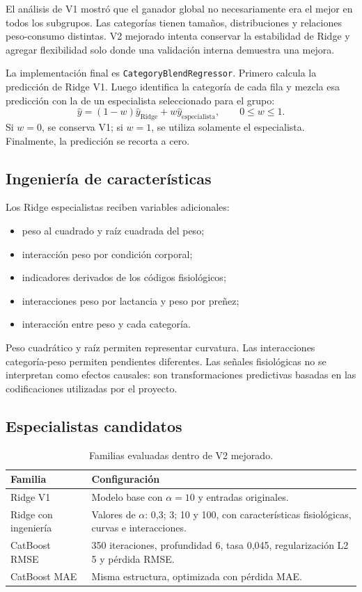 \documentclass[11pt,a4paper]{article}
\newcommand{\codigo}[1]{\nolinkurl{#1}}
\begin{document}
El análisis de V1 mostró que el ganador global no necesariamente era el mejor en todos los subgrupos. Las categorías tienen tamaños, distribuciones y relaciones peso-consumo distintas. V2 mejorado intenta conservar la estabilidad de Ridge y agregar flexibilidad solo donde una validación interna demuestra una mejora.

La implementación final es \codigo{CategoryBlendRegressor}. Primero calcula la predicción de Ridge V1. Luego identifica la categoría de cada fila y mezcla esa predicción con la de un especialista seleccionado para el grupo:
\begin{equation}
\hat y=(1-w)\hat y_{\text{Ridge}}+w\hat y_{\text{especialista}},\qquad 0\leq w\leq1.
\end{equation}
Si $w=0$, se conserva V1; si $w=1$, se utiliza solamente el especialista. Finalmente, la predicción se recorta a cero.

\subsection{Ingeniería de características}

Los Ridge especialistas reciben variables adicionales:
\begin{itemize}
  \item peso al cuadrado y raíz cuadrada del peso;
  \item interacción peso por condición corporal;
  \item indicadores derivados de los códigos fisiológicos;
  \item interacciones peso por lactancia y peso por preñez;
  \item interacción entre peso y cada categoría.
\end{itemize}

Peso cuadrático y raíz permiten representar curvatura. Las interacciones categoría-peso permiten pendientes diferentes. Las señales fisiológicas no se interpretan como efectos causales: son transformaciones predictivas basadas en las codificaciones utilizadas por el proyecto.

\subsection{Especialistas candidatos}

\begin{table}[H]
\centering
\caption{Familias evaluadas dentro de V2 mejorado.}
\begin{tabularx}{\textwidth}{p{4cm}X}
\toprule
\textbf{Familia} & \textbf{Configuración}\\
\midrule
Ridge V1 & Modelo base con $\alpha=10$ y entradas originales.\\
Ridge con ingeniería & Valores de $\alpha$: 0,3; 3; 10 y 100, con características fisiológicas, curvas e interacciones.\\
CatBoost RMSE & 350 iteraciones, profundidad 6, tasa 0,045, regularización L2 5 y pérdida RMSE.\\
CatBoost MAE & Misma estructura, optimizada con pérdida MAE.\\
\bottomrule
\end{tabularx}
\end{table}
\end{document}
